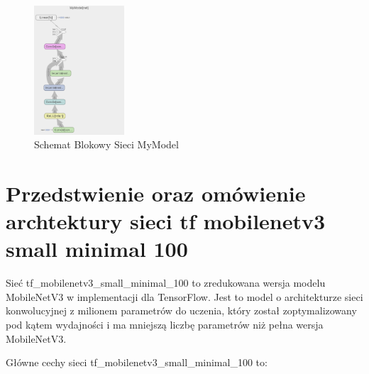 \documentclass[12pt,twoside]{article}
\begin{document}
\begin{figure}[h]
	\centering
	\includegraphics[width=0.3\textwidth]{figures/MyModel.png}
	\caption{Schemat Blokowy Sieci MyModel}
	\label{fig:dane1}
  \end{figure}

\clearpage
\section{Przedstwienie oraz omówienie archtektury sieci  tf mobilenetv3 small minimal 100 }


Sieć tf\_mobilenetv3\_small\_minimal\_100 to zredukowana wersja modelu MobileNetV3 w implementacji dla TensorFlow. Jest to model o architekturze sieci konwolucyjnej z milionem parametrów do uczenia, który został zoptymalizowany pod kątem wydajności i ma mniejszą liczbę parametrów niż pełna wersja MobileNetV3.

Główne cechy sieci tf\_mobilenetv3\_small\_minimal\_100 to:
\end{document}
